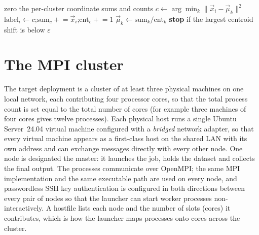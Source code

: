 \documentclass[11pt,a4paper]{article}
\begin{document}
\begin{algorithm}[H]
\caption{One $K$-means iteration (sequential, Lloyd's step).}
\label{alg:serial}
\begin{algorithmic}[1]
\State zero the per-cluster coordinate sums and counts
  \State $c \gets \arg\min_{k}\lVert \vec x_i-\vec\mu_k\rVert^{2}$ 
  \State $\text{label}_i \gets c$;\quad $\text{sum}_c \mathrel{+}= \vec x_i$;\quad $\text{cnt}_c \mathrel{+}= 1$
\EndFor
{}
  \State $\vec\mu_k \gets \text{sum}_k / \text{cnt}_k$ 
\EndFor
\State \textbf{stop} if the largest centroid shift is below $\varepsilon$
\end{algorithmic}
\end{algorithm}

\section{The MPI cluster}
\label{sec:cluster}

The target deployment is a cluster of at least three physical machines on one
local network, each contributing four processor cores, so that the total process
count is set equal to the total number of cores (for example three machines of
four cores gives twelve processes). Each physical host runs a single Ubuntu
Server~24.04 virtual machine configured with a \emph{bridged} network adapter, so
that every virtual machine appears as a first-class host on the shared LAN with
its own address and can exchange messages directly with every other node. One
node is designated the master: it launches the job, holds the dataset and
collects the final output. The processes communicate over OpenMPI; the same MPI
implementation and the same executable path are used on every node, and
passwordless SSH key authentication is configured in both directions between
every pair of nodes so that the launcher can start worker processes
non-interactively. A hostfile lists each node and the number of slots (cores) it
contributes, which is how the launcher maps processes onto cores across the
cluster.
\end{document}
